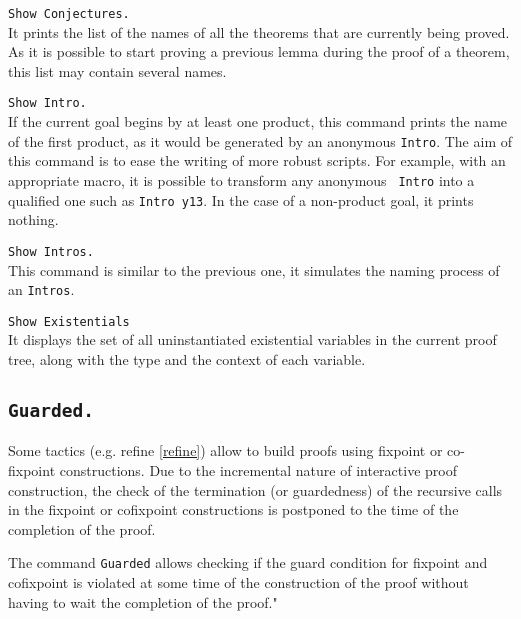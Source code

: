 \begin{Variants}
\item {\tt Show Conjectures.}\\
It prints the list of the names of all the theorems that 
are currently being proved.
As it is possible to start proving a previous lemma during
the proof of a theorem, this list may contain several 
names. 

\item{\tt Show Intro.}\\
If the current goal begins by at least one product, this command
prints the name of the first product, as it would be generated by 
an anonymous {\tt Intro}. The aim of this command is to ease the
writing of more robust scripts. For example, with an appropriate 
{\ProofGeneral} macro, it is possible to transform any anonymous {\tt
  Intro} into a qualified one such as {\tt Intro y13}.
In the case of a non-product goal, it prints nothing. 

\item{\tt Show Intros.}\\
This command is similar to the previous one, it simulates the naming 
process of an {\tt Intros}.

\item{\tt Show Existentials\label{ShowExistentials}}
\\ It displays
the set of all uninstantiated existential variables in the current proof tree, 
along with the type and the context of each variable.

\end{Variants}


\subsection[\tt Guarded.]{\tt Guarded.\label{Guarded}}

Some tactics (e.g. refine \ref{refine}) allow to build proofs using
fixpoint or co-fixpoint constructions. Due to the incremental nature
of interactive proof construction, the check of the termination (or
guardedness) of the recursive calls in the fixpoint or cofixpoint
constructions is postponed to the time of the completion of the proof.

The command \verb!Guarded! allows checking if the guard condition for
fixpoint and cofixpoint is violated at some time of the construction
of the proof without having to wait the completion of the proof."


